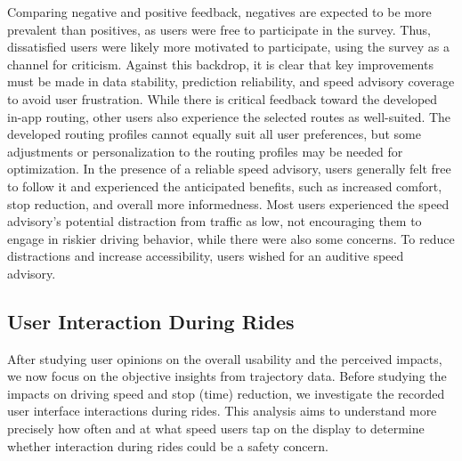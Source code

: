 Comparing negative and positive feedback, negatives are expected to be more prevalent than positives, as users were free to participate in the survey. Thus, dissatisfied users were likely more motivated to participate, using the survey as a channel for criticism. Against this backdrop, it is clear that key improvements must be made in data stability, prediction reliability, and speed advisory coverage to avoid user frustration. While there is critical feedback toward the developed in-app routing, other users also experience the selected routes as well-suited. The developed routing profiles cannot equally suit all user preferences, but some adjustments or personalization to the routing profiles may be needed for optimization. In the presence of a reliable speed advisory, users generally felt free to follow it and experienced the anticipated benefits, such as increased comfort, stop reduction, and overall more informedness. Most users experienced the speed advisory's potential distraction from traffic as low, not encouraging them to engage in riskier driving behavior, while there were also some concerns. To reduce distractions and increase accessibility, users wished for an auditive speed advisory.

\subsection{User Interaction During Rides}

After studying user opinions on the overall usability and the perceived impacts, we now focus on the objective insights from trajectory data. Before studying the impacts on driving speed and stop (time) reduction, we investigate the recorded user interface interactions during rides. This analysis aims to understand more precisely how often and at what speed users tap on the display to determine whether interaction during rides could be a safety concern.


